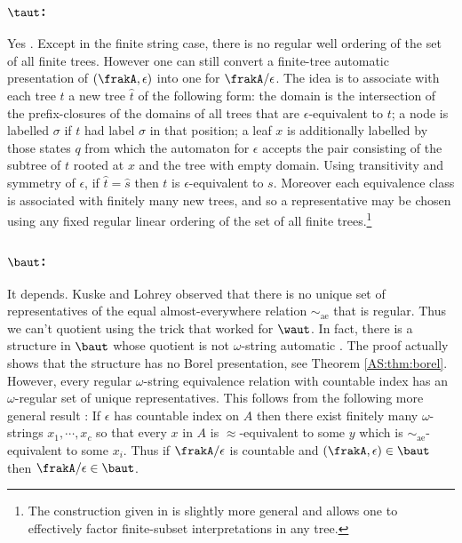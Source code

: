 \subsubsection*{$\taut$:} Yes \cite{CoLo07}.
Except in the finite string case, there is no regular well ordering of the set of
all finite trees. 
However one can still convert a finite-tree automatic presentation of $(\frakA,\epsilon)$ into
one for $\frakA/\epsilon$. The idea is to associate with each tree $t$ a
new tree $\hat{t}$ of the following form: the domain is the intersection 
of the prefix-closures of the domains of all trees that are $\epsilon$-equivalent to $t$; 
a node is labelled $\sigma$ if $t$ had label $\sigma$ in that position; 
a leaf $x$ is additionally labelled by those states $q$ from which the 
automaton for ${\epsilon}$ accepts the pair consisting of the subtree of $t$ 
rooted at $x$ and the tree with empty domain.
Using transitivity and symmetry of $\epsilon$, if $\hat{t} = \hat{s}$ 
then $t$ is $\epsilon$-equivalent to $s$. 
Moreover each equivalence class is associated with finitely many new trees, 
and so a representative may be chosen using any fixed regular linear ordering 
of the set of all finite trees.\footnote{The construction 
given in \cite{CoLo07} is slightly more general and allows one to effectively 
factor finite-subset interpretations in any tree.}

\subsubsection*{$\baut$:} It depends.
Kuske and Lohrey \cite{KuLo05} observed that there is no unique set of representatives of the equal almost-everywhere relation $\sim_{\textrm{ae}}$ that is regular.
Thus we can't quotient using the trick that worked for $\waut$. In fact, there is a structure in $\baut$ whose quotient is not $\omega$-string 
automatic \cite{HKMN08}. The proof actually shows that the structure has no Borel presentation, see Theorem \ref{AS:thm:borel}.
However, every regular $\omega$-string equivalence relation with countable index has an $\omega$-regular set of unique representatives.
This follows from the following more general result  \cite{BKRu08}:
If $\epsilon$ has countable index on $A$ then there exist finitely many $\omega$-strings $x_1,\cdots,x_c$ 
so that every $x$  in $A$ is $\approx$-equivalent to some $y$ which is $\sim_{\textrm{ae}}$-equivalent to some  $x_i$.  Thus if $\frakA /\epsilon$ is 
countable and $(\frakA,\epsilon) \in \baut$ then $\frakA/\epsilon \in \baut$.

